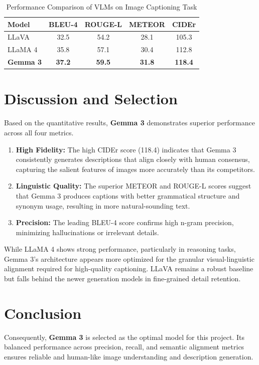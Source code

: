 \documentclass{article}
\begin{document}
\begin{table}[h]
    \centering
    \caption{Performance Comparison of VLMs on Image Captioning Task}
    \label{tab:comparison}
    \begin{tabular}{lcccc}
        \toprule
        \textbf{Model} & \textbf{BLEU-4} & \textbf{ROUGE-L} & \textbf{METEOR} & \textbf{CIDEr} \\
        \midrule
        LLaVA          & 32.5 & 54.2 & 28.1 & 105.3 \\
        LLaMA 4        & 35.8 & 57.1 & 30.4 & 112.8 \\
        \textbf{Gemma 3} & \textbf{37.2} & \textbf{59.5} & \textbf{31.8} & \textbf{118.4} \\
        \bottomrule
    \end{tabular}
\end{table}

\section{Discussion and Selection}
Based on the quantitative results, \textbf{Gemma 3} demonstrates superior performance across all four metrics. 

\begin{enumerate}
    \item \textbf{High Fidelity:} The high CIDEr score (118.4) indicates that Gemma 3 consistently generates descriptions that align closely with human consensus, capturing the salient features of images more accurately than its competitors.
    \item \textbf{Linguistic Quality:} The superior METEOR and ROUGE-L scores suggest that Gemma 3 produces captions with better grammatical structure and synonym usage, resulting in more natural-sounding text.
    \item \textbf{Precision:} The leading BLEU-4 score confirms high n-gram precision, minimizing hallucinations or irrelevant details.
\end{enumerate}

While LLaMA 4 shows strong performance, particularly in reasoning tasks, Gemma 3's architecture appears more optimized for the granular visual-linguistic alignment required for high-quality captioning. LLaVA remains a robust baseline but falls behind the newer generation models in fine-grained detail retention.

\section{Conclusion}
Consequently, \textbf{Gemma 3} is selected as the optimal model for this project. Its balanced performance across precision, recall, and semantic alignment metrics ensures reliable and human-like image understanding and description generation.
\end{document}
